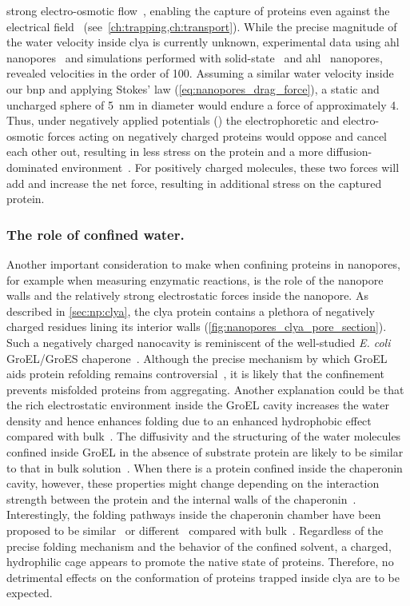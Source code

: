 strong electro-osmotic flow~\cite{Franceschini-2016}, enabling the capture of proteins even against the
electrical field~\cite{Soskine-2012} (see~\cref{ch:trapping,ch:transport}). While the precise magnitude of the
water velocity inside \gls{clya} is currently unknown, experimental data using \gls{ahl}
nanopores~\cite{Paula-1999} and simulations performed with solid-state~\cite{vanDorp-2009,Luan-2008} and
\gls{ahl}~\cite{Aksimentiev-2005,Pederson-2015} nanopores, revealed velocities in the order of
\SI{100}{\mmps}. Assuming a similar water velocity inside our \gls{bnp} and applying Stokes' law
(\cref{eq:nanopores_drag_force}), a static and uncharged sphere of \SI{5}{\nm} in diameter would endure a
force of approximately \SI{4}{\pN}. Thus, under negatively applied potentials (\transi{}) the electrophoretic
and electro-osmotic forces acting on negatively charged proteins would oppose and cancel each other out,
resulting in less stress on the protein and a more diffusion-dominated environment~\cite{Firnkes-2010}. For
positively charged molecules, these two forces will add and increase the net force, resulting in additional
stress on the captured protein.

\subsubsection{The role of confined water.}
%

Another important consideration to make when confining proteins in nanopores, for example when measuring
enzymatic reactions, is the role of the nanopore walls and the relatively strong electrostatic forces inside
the nanopore. As described in \cref{sec:np:clya}, the \gls{clya} protein contains a plethora of negatively
charged residues lining its interior walls (\cref{fig:nanopores_clya_pore_section}). Such a negatively charged
nanocavity is reminiscent of the well-studied \textit{E. coli} {GroEL/GroES} chaperone~\cite{Xu-1997}.
Although the precise mechanism by which {GroEL} aids protein refolding remains
controversial~\cite{England-2008,England-2008b,Motojima-2012,Weber-2013}, it is likely that the confinement
prevents misfolded proteins from aggregating. Another explanation could be that the rich electrostatic
environment inside the {GroEL} cavity increases the water density and hence enhances folding due to an
enhanced hydrophobic effect compared with bulk~\cite{England-2008,England-2008b}. The diffusivity and the
structuring of the water molecules confined inside {GroEL} in the absence of substrate protein are likely to
be similar to that in bulk solution~\cite{Franck-2014}. When there is a protein confined inside the chaperonin
cavity, however, these properties might change depending on the interaction strength between the protein and
the internal walls of the chaperonin~\cite{Weber-2013}. Interestingly, the folding pathways inside the
chaperonin chamber have been proposed to be similar~\cite{Horst-2007} or different~\cite{Jewett-2004} compared
with bulk~\cite{Apetri-2008}. Regardless of the precise folding mechanism and the behavior of the confined
solvent, a charged, hydrophilic cage appears to promote the native state of proteins. Therefore, no
detrimental effects on the conformation of proteins trapped inside \gls{clya} are to be expected.


